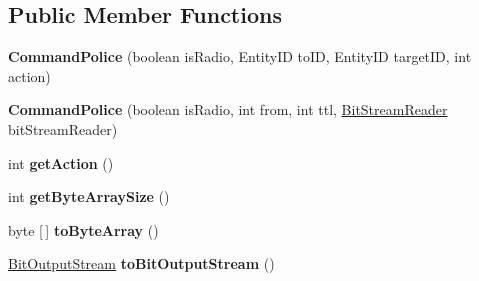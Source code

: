 \subsection*{Public Member Functions}
\begin{DoxyCompactItemize}
\item 
\hypertarget{classadf_1_1agent_1_1communication_1_1standard_1_1bundle_1_1centralized_1_1CommandPolice_ac747822b23d13b000beb3b87899123a1}{}\label{classadf_1_1agent_1_1communication_1_1standard_1_1bundle_1_1centralized_1_1CommandPolice_ac747822b23d13b000beb3b87899123a1} 
{\bfseries Command\+Police} (boolean is\+Radio, Entity\+ID to\+ID, Entity\+ID target\+ID, int action)
\item 
\hypertarget{classadf_1_1agent_1_1communication_1_1standard_1_1bundle_1_1centralized_1_1CommandPolice_ae700d27dad6fa5ee05fa26f99b61e26e}{}\label{classadf_1_1agent_1_1communication_1_1standard_1_1bundle_1_1centralized_1_1CommandPolice_ae700d27dad6fa5ee05fa26f99b61e26e} 
{\bfseries Command\+Police} (boolean is\+Radio, int from, int ttl, \hyperlink{classadf_1_1component_1_1communication_1_1util_1_1BitStreamReader}{Bit\+Stream\+Reader} bit\+Stream\+Reader)
\item 
\hypertarget{classadf_1_1agent_1_1communication_1_1standard_1_1bundle_1_1centralized_1_1CommandPolice_a0460d50153618a65c5a39253c7947ec3}{}\label{classadf_1_1agent_1_1communication_1_1standard_1_1bundle_1_1centralized_1_1CommandPolice_a0460d50153618a65c5a39253c7947ec3} 
int {\bfseries get\+Action} ()
\item 
\hypertarget{classadf_1_1agent_1_1communication_1_1standard_1_1bundle_1_1centralized_1_1CommandPolice_aaa4419097722ca8e6296e9c943bb9bdc}{}\label{classadf_1_1agent_1_1communication_1_1standard_1_1bundle_1_1centralized_1_1CommandPolice_aaa4419097722ca8e6296e9c943bb9bdc} 
int {\bfseries get\+Byte\+Array\+Size} ()
\item 
\hypertarget{classadf_1_1agent_1_1communication_1_1standard_1_1bundle_1_1centralized_1_1CommandPolice_ae3b054102b803bfc346cc0eb3c2a5e67}{}\label{classadf_1_1agent_1_1communication_1_1standard_1_1bundle_1_1centralized_1_1CommandPolice_ae3b054102b803bfc346cc0eb3c2a5e67} 
byte \mbox{[}$\,$\mbox{]} {\bfseries to\+Byte\+Array} ()
\item 
\hypertarget{classadf_1_1agent_1_1communication_1_1standard_1_1bundle_1_1centralized_1_1CommandPolice_a989a2862919a4f61ece93dd21668b1fd}{}\label{classadf_1_1agent_1_1communication_1_1standard_1_1bundle_1_1centralized_1_1CommandPolice_a989a2862919a4f61ece93dd21668b1fd} 
\hyperlink{classadf_1_1component_1_1communication_1_1util_1_1BitOutputStream}{Bit\+Output\+Stream} {\bfseries to\+Bit\+Output\+Stream} ()

\end{DoxyCompactItemize}
